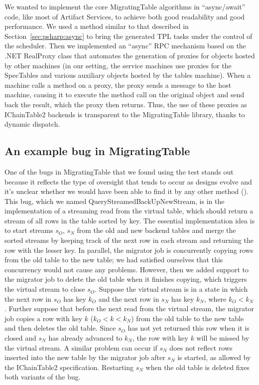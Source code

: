 We wanted to implement the core MigratingTable algorithms in \csharp ``async/await'' code, like most of Artifact Services, to achieve both good readability and good performance.  We used a method similar to that described in Section~\ref{sec:psharp:async} to bring the generated TPL tasks under the control of the \psharp scheduler.  Then we implemented an ``async'' RPC mechanism based on the .NET RealProxy class that automates the generation of proxies for objects hosted by other \psharp machines (in our setting, the service machines use proxies for the SpecTables and various auxiliary objects hosted by the tables machine).  When a machine calls a method on a proxy, the proxy sends a \psharp message to the host machine, causing it to execute the method call on the original object and send back the result, which the proxy then returns.  Thus, the use of these proxies as IChainTable2 backends is transparent to the MigratingTable library, thanks to dynamic dispatch.

\subsection{An example bug in MigratingTable}

One of the bugs in MigratingTable that we found using the \psharp test stands out because it reflects the type of oversight that tends to occur as designs evolve and it's unclear whether we would have been able to find it by any other method ().  This bug, which we named QueryStreamedBackUpNewStream, is in the implementation of a streaming read from the virtual table, which should return a stream of all rows in the table sorted by key.  The essential implementation idea is to start streams $s_O$, $s_N$ from the old and new backend tables and merge the sorted streams by keeping track of the next row in each stream and returning the row with the lesser key.  In parallel, the migrator job is concurrently copying rows from the old table to the new table; we had satisfied ourselves that this concurrency would not cause any problems.  However, then we added support to the migrator job to delete the old table when it finishes copying, which triggers the virtual stream to close $s_O$.  Suppose the virtual stream is in a state in which the next row in $s_O$ has key $k_O$ and the next row in $s_N$ has key $k_N$, where $k_O < k_N$.  Further suppose that before the next read from the virtual stream, the migrator job copies a row with key $k$ ($k_O < k < k_N$) from the old table to the new table and then deletes the old table.  Since $s_O$ has not yet returned this row when it is closed and $s_N$ has already advanced to $k_N$, the row with key $k$ will be missed by the virtual stream.  A similar problem can occur if $s_N$ does not reflect rows inserted into the new table by the migrator job after $s_N$ is started, as allowed by the IChainTable2 specification.  Restarting $s_N$ when the old table is deleted fixes both variants of the bug.

